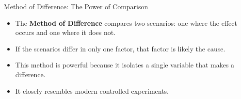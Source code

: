 \documentclass{beamer}
\begin{document}
\begin{frame}{Method of Difference: The Power of Comparison}
    \begin{itemize}
        \item The \textbf{Method of Difference} compares two scenarios: one where the effect occurs and one where it does not.
        \item If the scenarios differ in only one factor, that factor is likely the cause.
        \item This method is powerful because it isolates a single variable that makes a difference.
        \item It closely resembles modern controlled experiments.
    \end{itemize}
    
    \begin{center}
    \end{center}
\end{frame}
\end{document}
